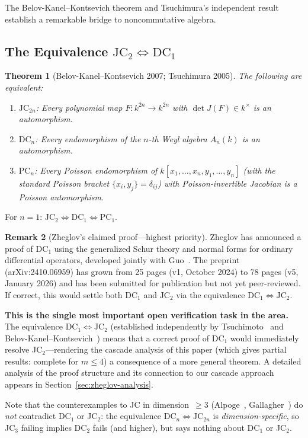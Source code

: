 \documentclass[12pt,a4paper]{article}
\newtheorem{theorem}{Theorem}[section]
\theoremstyle{definition}
\newtheorem{remark}[theorem]{Remark}
\newcommand{\kk}{k}
\begin{document}
The Belov-Kanel--Kontsevich theorem \cite{BKK} and Tsuchimura's independent result
\cite{Tsuchimoto} establish a remarkable bridge to noncommutative algebra.

\subsection{The Equivalence $\mathrm{JC}_2 \Longleftrightarrow \mathrm{DC}_1$}

\begin{theorem}[Belov-Kanel--Kontsevich 2007; Tsuchimura 2005]
The following are equivalent:
\begin{enumerate}
\item $\mathrm{JC}_{2n}$: Every polynomial map $F: \kk^{2n} \to \kk^{2n}$ with
  $\det J(F) \in \kk^\times$ is an automorphism.
\item $\mathrm{DC}_n$: Every endomorphism of the $n$-th Weyl algebra $A_n(\kk)$ is an
  automorphism.
\item $\mathrm{PC}_n$: Every Poisson endomorphism of $\kk[x_1,\ldots,x_n,y_1,\ldots,y_n]$
  (with the standard Poisson bracket $\{x_i, y_j\} = \delta_{ij}$) with Poisson-invertible
  Jacobian is a Poisson automorphism.
\end{enumerate}
\end{theorem}

For $n = 1$: $\mathrm{JC}_2 \iff \mathrm{DC}_1 \iff \mathrm{PC}_1$.

\begin{remark}[Zheglov's claimed proof---highest priority]\label{rem:zheglov}
Zheglov \cite{Zheglov2024} has announced a proof of $\mathrm{DC}_1$ using the
generalized Schur theory and normal forms for ordinary differential operators,
developed jointly with Guo~\cite{GuoZheglov1, GuoZheglov2, GuoZheglov3}.
The preprint (arXiv:2410.06959) has grown from 25 pages (v1, October 2024) to
78 pages (v5, January 2026) and has been submitted for publication but not yet
peer-reviewed.  If correct, this would settle both $\mathrm{DC}_1$ and
$\mathrm{JC}_2$ via the equivalence $\mathrm{DC}_1 \iff \mathrm{JC}_2$.

\textbf{This is the single most important open verification task in the
area.} The equivalence $\mathrm{DC}_1 \iff \mathrm{JC}_2$ (established
independently by Tsuchimoto~\cite{Tsuchimoto} and
Belov-Kanel--Kontsevich~\cite{BKK}) means that a correct proof of
$\mathrm{DC}_1$ would immediately resolve JC$_2$---rendering the cascade
analysis of this paper (which gives partial results: complete for
$m \leq 4$) a consequence of a more general theorem.
A detailed analysis of the proof structure and its connection to
our cascade approach appears in Section~\ref{sec:zheglov-analysis}.

Note that the counterexamples to JC in dimension~$\geq 3$
(Alpoge~\cite{Alpoge2026}, Gallagher~\cite{Gallagher2026}) do
\emph{not} contradict DC$_1$ or JC$_2$: the equivalence
$\mathrm{DC}_n \iff \mathrm{JC}_{2n}$ is \emph{dimension-specific},
so JC$_3$ failing implies DC$_2$ fails (and higher), but says nothing
about DC$_1$ or JC$_2$.
\end{remark}
\end{document}
